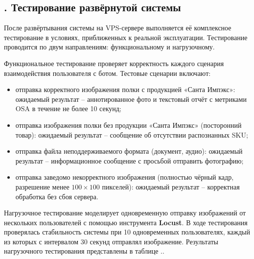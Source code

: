 \subtitlespace
\subsection*{
	\gostTitleFont
	\redline
	\thechaptercntr .\thesubchaptercntr \spc
	Тестирование развёрнутой системы
} \addtocounter{subchaptercntr}{1}

\subtitlespace

{\gostFont

	\par \redline После развёртывания системы на VPS-сервере выполняется её комплексное тестирование в условиях, приближенных к реальной эксплуатации.
	Тестирование проводится по двум направлениям: функциональному и нагрузочному.

	\par \redline Функциональное тестирование проверяет корректность каждого сценария взаимодействия пользователя с ботом.
	Тестовые сценарии включают:

	\begin{itemize}[leftmargin=2.15cm, labelwidth=0.65cm, labelsep=0.0cm]

		\item[\theitemcntr.] отправка корректного изображения полки с продукцией «Санта Импэкс»: ожидаемый результат {--} аннотированное фото и текстовый отчёт с метриками OSA в течение не более 10 секунд;
		\addtocounter{itemcntr}{1}

		\item[\theitemcntr.] отправка изображения полки без продукции «Санта Импэкс» (посторонний товар): ожидаемый результат {--} сообщение об отсутствии распознанных SKU;
		\addtocounter{itemcntr}{1}

		\item[\theitemcntr.] отправка файла неподдерживаемого формата (документ, аудио): ожидаемый результат {--} информационное сообщение с просьбой отправить фотографию;
		\addtocounter{itemcntr}{1}

		\item[\theitemcntr.] отправка заведомо некорректного изображения (полностью чёрный кадр, разрешение менее $100 \times 100$ пикселей): ожидаемый результат {--} корректная обработка без сбоя сервера.
		\addtocounter{itemcntr}{1}

	\end{itemize} \setcounter{itemcntr}{1}

	\par \redline Нагрузочное тестирование моделирует одновременную отправку изображений от нескольких пользователей с помощью инструмента \textbf{Locust}.
	В ходе тестирования проверялась стабильность системы при 10 одновременных пользователях, каждый из которых с интервалом 30 секунд отправлял изображение.
	Результаты нагрузочного тестирования представлены в таблице \thechaptercntr .\thetablecntr.

}

